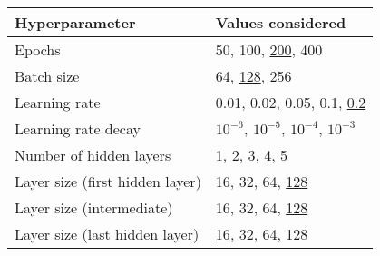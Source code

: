 \begin{tabular}{ll}
  \toprule
  Hyperparameter & Values considered \\
  \midrule
  Epochs & 50, 100, \underline{200}, 400 \\[0.1em]
  Batch size & 64, \underline{128}, 256 \\[0.1em]
  Learning rate & 0.01, 0.02, 0.05, 0.1, \underline{0.2} \\[0.1em]
  Learning rate decay & $10^{-6}$, \underline{$10^{-5}$}, $10^{-4}$, $10^{-3}$ \\[0.1em]
  Number of hidden layers & 1, 2, 3, \underline{4}, 5 \\[0.1em]
  Layer size (first hidden layer) & 16, 32, 64, \underline{128} \\[0.1em]
  Layer size (intermediate) & 16, 32, 64, \underline{128} \\[0.1em]
  Layer size (last hidden layer) & \underline{16}, 32, 64, 128 \\
  \bottomrule
\end{tabular}

